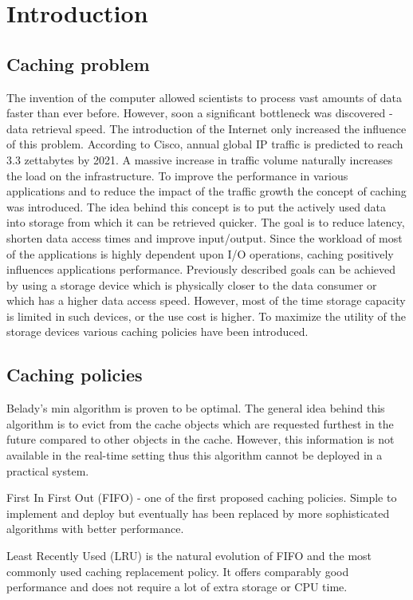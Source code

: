 \section{Introduction}
\subsection{Caching problem}

The invention of the computer allowed scientists to process vast amounts of data faster than ever before. However, soon a significant bottleneck was discovered - data retrieval speed. The introduction of the Internet only increased the influence of this problem. According to Cisco, annual global IP traffic is predicted to reach 3.3 zettabytes by 2021\cite{1}. A massive increase in traffic volume naturally increases the load on the infrastructure. To improve the performance in various applications and to reduce the impact of the traffic growth the concept of caching was introduced. The idea behind this concept is to put the actively used data into storage from which it can be retrieved quicker. The goal is to reduce latency, shorten data access times and improve input/output. Since the workload of most of the applications is highly dependent upon I/O operations, caching positively influences applications performance. Previously described goals can be achieved by using a storage device which is physically closer to the data consumer or which has a higher data access speed. However, most of the time storage capacity is limited in such devices, or the use cost is higher. To maximize the utility of the storage devices various caching policies have been introduced.

\subsection{Caching policies}

Belady's min algorithm is proven to be optimal\cite{2}. The general idea behind this algorithm is to evict from the cache objects which are requested furthest in the future compared to other objects in the cache. However, this information is not available in the real-time setting thus this algorithm cannot be deployed in a practical system.

First In First Out (FIFO) - one of the first proposed caching policies. Simple to implement and deploy but eventually has been replaced by more sophisticated algorithms with better performance.

Least Recently Used (LRU) is the natural evolution of FIFO and the most commonly used caching replacement policy. It offers comparably good performance and does not require a lot of extra storage or CPU time.

